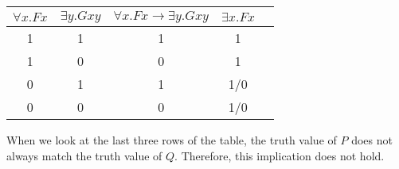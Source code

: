\documentclass[11pt,a4paper]{article}
\begin{document}
\begin{tabular}{ccccc}
$\forall x.Fx$ & $\exists y.Gxy$ & $\forall x.Fx \rightarrow \exists y.Gxy$ & $\exists x.Fx$\\ \hline
1 & 1 & 1 & 1\\
1 & 0 & 0 & 1\\
0 & 1 & 1 & 1/0\\
0 & 0 & 0 & 1/0\\
\end{tabular}

\vspace{10pt}
\noindent When we look at the last three rows of the table, the truth value of $P$ does not always match the truth value of $Q$. Therefore, this implication does not hold.
\end{document}
